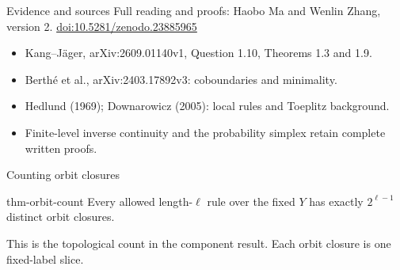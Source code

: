 \documentclass{beamer}
\begin{document}
\begin{frame}{Evidence and sources}
Full reading and proofs: Haobo Ma and Wenlin Zhang, version 2.
\medskip
\href{https://doi.org/10.5281/zenodo.23885965}{doi:10.5281/zenodo.23885965}
\begin{itemize}
\item Kang--Jäger, arXiv:2609.01140v1, Question 1.10, Theorems 1.3 and 1.9.
\item Berthé et al., arXiv:2403.17892v3: coboundaries and minimality.
\item Hedlund (1969); Downarowicz (2005): local rules and Toeplitz background.
\item Finite-level inverse continuity and the probability simplex retain complete written proofs.
\end{itemize}
\end{frame}

\begin{frame}{Counting orbit closures}

\begin{bookresult}{thm-orbit-count}
Every allowed length-$\ell$ rule over the fixed $Y$ has exactly $2^{\ell-1}$ distinct orbit closures.
\end{bookresult}
This is the topological count in the component result. Each orbit closure is one fixed-label slice.
\end{frame}

\FormalVerification
\end{document}
